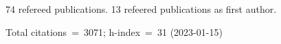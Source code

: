 74 refereed publications. 13 refeered publications as first author.

Total citations~=~3071; h-index~=~31 (2023-01-15)